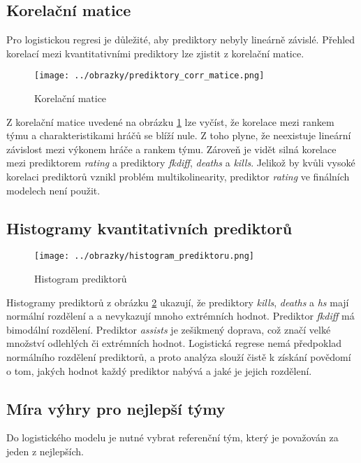 \subsection{Korelační matice}
Pro logistickou regresi je důležité, aby prediktory nebyly lineárně závislé. Přehled korelací mezi kvantitativními prediktory lze zjistit z korelační matice.

\begin{figure}[H]
    \centering
    \texttt{[image: ../obrazky/prediktory\_corr\_matice.png]}
    \caption{Korelační matice} 
    \label{fig:korelacni_matice}
\end{figure}

Z korelační matice uvedené na obrázku \ref{fig:korelacni_matice} lze vyčíst, že korelace mezi rankem týmu a charakteristikami hráčů se blíží nule. Z toho plyne, že neexistuje
lineární závislost mezi výkonem hráče a rankem týmu. Zároveň je vidět silná korelace mezi prediktorem \textit{rating} a prediktory \textit{fkdiff}, \textit{deaths} a
\textit{kills}. Jelikož by kvůli vysoké korelaci prediktorů vznikl problém multikolinearity, prediktor \textit{rating} ve finálních modelech není použit.

\subsection{Histogramy kvantitativních prediktorů}

\begin{figure}[H]
    \centering
    \texttt{[image: ../obrazky/histogram\_prediktoru.png]}
    \caption{Histogram prediktorů} 
    \label{fig:histogram_prediktoru}
\end{figure}

Histogramy prediktorů z obrázku \ref{fig:histogram_prediktoru} ukazují, že prediktory \textit{kills}, \textit{deaths} a \textit{hs} mají normální rozdělení
a a nevykazují mnoho extrémních hodnot. Prediktor \textit{fkdiff} má bimodální rozdělení. Prediktor \textit{assists} je 
zešikmený doprava, což značí velké množství odlehlých či extrémních hodnot. Logistická regrese nemá předpoklad normálního rozdělení prediktorů, a proto analýza
slouží čistě k získání povědomí o tom, jakých hodnot každý prediktor nabývá a jaké je jejich rozdělení.

\subsection{Míra výhry pro nejlepší týmy}
Do logistického modelu je nutné vybrat referenční tým, který je považován za jeden z nejlepších. 

